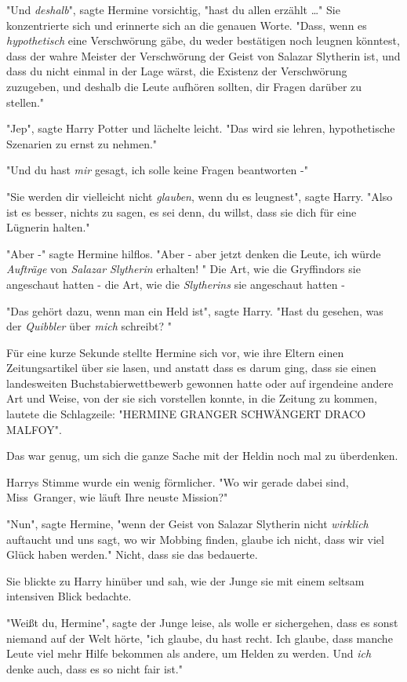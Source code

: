 {"Und \emph{deshalb}", sagte Hermine vorsichtig, "hast du allen erzählt …" Sie konzentrierte sich und erinnerte sich an die genauen Worte. "Dass, wenn es \emph{hypothetisch} eine Verschwörung gäbe, du weder bestätigen noch leugnen könntest, dass der wahre Meister der Verschwörung der Geist von Salazar Slytherin ist, und dass du nicht einmal in der Lage wärst, die Existenz der Verschwörung zuzugeben, und deshalb die Leute aufhören sollten, dir Fragen darüber zu stellen."

"Jep", sagte Harry Potter und lächelte leicht. "Das wird sie lehren, hypothetische Szenarien zu ernst zu nehmen."

"Und du hast \emph{mir} gesagt, ich solle keine Fragen beantworten -"

"Sie werden dir vielleicht nicht \emph{glauben}, wenn du es leugnest", sagte Harry. "Also ist es besser, nichts zu sagen, es sei denn, du willst, dass sie dich für eine Lügnerin halten."

"Aber -" sagte Hermine hilflos. "Aber - aber jetzt denken die Leute, ich würde \emph{Aufträge} von \emph{Salazar Slytherin} erhalten! " Die Art, wie die Gryffindors sie angeschaut hatten - die Art, wie die \emph{Slytherins} sie angeschaut hatten -

"Das gehört dazu, wenn man ein Held ist", sagte Harry. "Hast du gesehen, was der \emph{Quibbler} über \emph{mich} schreibt? "

Für eine kurze Sekunde stellte Hermine sich vor, wie ihre Eltern einen Zeitungsartikel über sie lasen, und anstatt dass es darum ging, dass sie einen landesweiten Buchstabierwettbewerb gewonnen hatte oder auf irgendeine andere Art und Weise, von der sie sich vorstellen konnte, in die Zeitung zu kommen, lautete die Schlagzeile: "HERMINE GRANGER SCHWÄNGERT DRACO MALFOY".

Das war genug, um sich die ganze Sache mit der Heldin noch mal zu überdenken.

Harrys Stimme wurde ein wenig förmlicher. "Wo wir gerade dabei sind, Miss~Granger, wie läuft Ihre neuste Mission?"

"Nun", sagte Hermine, "wenn der Geist von Salazar Slytherin nicht \emph{wirklich} auftaucht und uns sagt, wo wir Mobbing finden, glaube ich nicht, dass wir viel Glück haben werden." Nicht, dass sie das bedauerte.

Sie blickte zu Harry hinüber und sah, wie der Junge sie mit einem seltsam intensiven Blick bedachte.

"Weißt du, Hermine", sagte der Junge leise, als wolle er sichergehen, dass es sonst niemand auf der Welt hörte, "ich glaube, du hast recht. Ich glaube, dass manche Leute viel mehr Hilfe bekommen als andere, um Helden zu werden. Und \emph{ich} denke auch, dass es so nicht fair ist."

}
